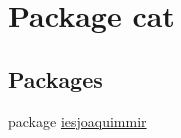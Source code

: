 \hypertarget{namespacecat}{}\section{Package cat}
\label{namespacecat}
\subsection*{Packages}
\begin{DoxyCompactItemize}
\item 
package \mbox{\hyperlink{namespacecat_1_1iesjoaquimmir}{iesjoaquimmir}}
\end{DoxyCompactItemize}
